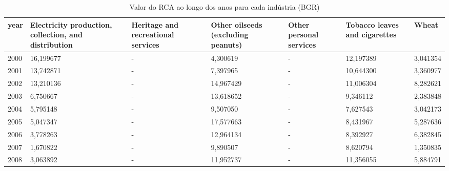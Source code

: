 \begin{table}
\centering
\caption{Valor do RCA ao longo dos anos para cada indústria (BGR)}
\begin{tabular}{p{1cm}p{2cm}p{2cm}p{2cm}p{2cm}p{2cm}p{2cm}}
\toprule
 year &  Electricity production, collection, and distribution &  Heritage and recreational services &  Other oilseeds (excluding peanuts) &  Other personal services &  Tobacco leaves and cigarettes &     Wheat \\
\midrule
 2000 &                                          16,199677 &                                   - &                            4,300619 &                        - &                      12,197389 &  3,041354 \\
 2001 &                                          13,742871 &                                   - &                            7,397965 &                        - &                      10,644300 &  3,360977 \\
 2002 &                                          13,210136 &                                   - &                           14,967429 &                        - &                      11,006304 &  8,282621 \\
 2003 &                                           6,750667 &                                   - &                           13,618652 &                        - &                       9,346112 &  2,383848 \\
 2004 &                                           5,795148 &                                   - &                            9,507050 &                        - &                       7,627543 &  3,042173 \\
 2005 &                                           5,047347 &                                   - &                           17,577663 &                        - &                       8,431967 &  5,287636 \\
 2006 &                                           3,778263 &                                   - &                           12,964134 &                        - &                       8,392927 &  6,382845 \\
 2007 &                                           1,670822 &                                   - &                            9,890507 &                        - &                       8,620794 &  1,350835 \\
 2008 &                                           3,063892 &                                   - &                           11,952737 &                        - &                      11,356055 &  5,884791 \\

\end{tabular}
\end{table}
